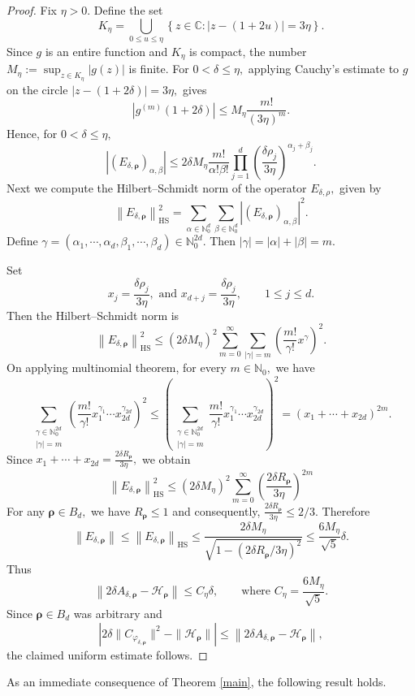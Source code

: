 \documentclass[12pt, reqno]{amsart}
\numberwithin{equation}{section}
\begin{document}
\begin{proof}
Fix $\eta>0$.
Define the set
\[
K_{\eta} =\bigcup_{0\leq u \leq \eta}\left\{z\in\mathbb{C}:|z-(1+2u)|=3\eta
\right\}.
\]
Since \(g\) is an entire function and \(K_\eta\) is compact, the number $M_\eta := \sup_{z\in K_\eta}|g(z)|$ is finite.
For $0<\delta\leq \eta,$ applying  Cauchy's estimate  to \(g\) on the circle
$|z-(1+2\delta)|=3\eta,$
gives
\[
|g^{(m)}(1+2\delta)|
\leq
M_\eta\frac{m!}{(3\eta)^m}.
\]
Hence, for  $0<\delta\leq \eta,$
\[
|(E_{\delta,\boldsymbol{\rho}})_{\alpha,\beta}|
\leq
2\delta M_\eta
\frac{m!}{\alpha!\beta!}
\prod_{j=1}^{d}
\left(\frac{\delta\rho_j}{3\eta}\right)^{\alpha_j+\beta_j}.
\]
Next we compute the Hilbert--Schmidt norm of the operator $E_{\delta,\rho},$ given by
\[
\left\|E_{\delta,\boldsymbol{\rho}}\right\|_{\mathrm{HS}}^2
=
\sum_{\alpha\in\mathbb{N}_{0}^{d}}
\sum_{\beta\in\mathbb{N}_{0}^{d}}
|(E_{\delta,\boldsymbol{\rho}})_{\alpha,\beta}|^{2}.
\]
Define $\gamma=(\alpha_1, \cdots,\alpha_d, \beta_1, \cdots, \beta_d)\in \mathbb{N}_{0}^{2d}.$ Then $|\gamma|=|\alpha|+|\beta|=m.$

Set
\[
x_j=\frac{\delta\rho_j}{3\eta},
\text{ and }
x_{d+j}=\frac{\delta\rho_j}{3\eta},
\qquad
1\leq j\leq d.
\]
Then the Hilbert--Schmidt norm is
\[
\left\|E_{\delta,\boldsymbol{\rho}}\right\|_{\mathrm{HS}}^2\leq(2\delta M_{\eta})^2\sum_{m=0}^{\infty}\sum_{|\gamma|=m}\left(\frac{m!}{\gamma!}x^{\gamma} \right)^2.
\]
On applying multinomial theorem, for every $m\in\mathbb{N}_{0},$ we have
\[
\sum_{\substack{\gamma\in\mathbb{N}_{0}^{2d}\\|\gamma|=m}}
\left(
\frac{m!}{\gamma!}
x_1^{\gamma_1}\cdots x_{2d}^{\gamma_{2d}}
\right)^2                                                       \leq
\left(
\sum_{\substack{\gamma\in\mathbb{N}_{0}^{2d}\\|\gamma|=m}}
\frac{m!}{\gamma!}
x_1^{\gamma_1}\cdots x_{2d}^{\gamma_{2d}}
\right)^2
 =(x_1+\cdots+x_{2d})^{2m}.
\]
Since
$x_1+\cdots+x_{2d} = \frac{2\delta R_{\boldsymbol{\rho}}}{3\eta},$
we obtain
\[
\left\|E_{\delta,\boldsymbol{\rho}}\right\|_{\mathrm{HS}}^2\leq
(2\delta M_\eta)^2
\sum_{m=0}^{\infty}
\left(
\frac{2\delta R_{\boldsymbol{\rho}}}{3\eta}
\right)^{2m}
\]
For any $\boldsymbol{\rho}\in B_d,$ we have $R_{\boldsymbol{\rho}}\leq1$ and  consequently, $\frac{2\delta R_{\boldsymbol{\rho}}}{3\eta}\leq 2/3$. Therefore
\[
\left\|E_{\delta,\boldsymbol{\rho}}\right\|
\leq
\left\|E_{\delta,\boldsymbol{\rho}}\right\|_{\mathrm{HS}}
\leq
\frac{2\delta M_\eta}
{\sqrt{1-\left(2\delta R_{\boldsymbol{\rho}}/3\eta\right)^2}}\leq\frac{6M_\eta}{\sqrt{5}}\delta.
\]
Thus
\[
\left\|
2\delta A_{\delta,\boldsymbol{\rho}}
-
\mathcal{H}_{\boldsymbol{\rho}}
\right\|
\leq
C_\eta\delta, \qquad \text{where } C_\eta=\frac{6M_\eta}{\sqrt{5}}.
\]
Since $\boldsymbol{\rho}\in B_d$ was arbitrary and
\[
\left|
2\delta\|C_{\varphi_{\delta,\boldsymbol\rho}}\|^2
-
\|\mathcal H_{\boldsymbol\rho}\|
\right|
\le
\left\|
2\delta A_{\delta,\boldsymbol\rho}
-
\mathcal H_{\boldsymbol\rho}
\right\|,
\]
the claimed uniform estimate follows.

\end{proof}
As an immediate consequence of Theorem \ref{main}, the following result holds.
\end{document}
